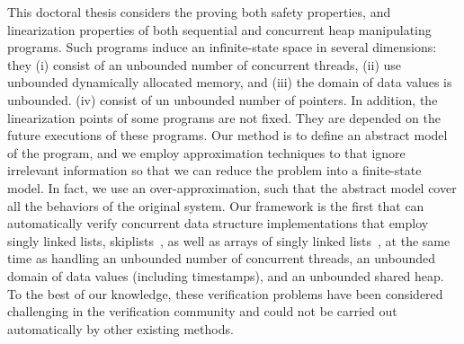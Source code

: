 
This doctoral thesis considers the proving both safety properties, and linearization properties of
both sequential and concurrent heap manipulating programs.
Such programs induce an infinite-state space in several dimensions:
they %
(i) consist of an unbounded number of concurrent threads, %
(ii) use unbounded dynamically allocated memory, and %
(iii) the domain of data values is unbounded. %
(iv) consist of un unbounded number of pointers. 
In addition, the linearization points of some programs are not fixed. They are depended on the future executions of these programs. 
Our method is to define an abstract model of the program, and we employ approximation techniques to that ignore irrelevant information so that we can reduce the problem into a finite-state model. In fact, we use an over-approximation, such that the abstract model cover all the behaviors of the original system.  Our framework is the first that
can automatically verify concurrent data structure implementations that employ
singly linked lists, skiplists~\cite{Fomitchev:2004,ArtOfMpP,Sundell:2005},
as well as arrays of singly linked lists~\cite{ts-stack},
at the same time as handling an unbounded
number of concurrent threads, an unbounded domain of data values
(including timestamps), and an unbounded shared heap. To the best of our knowledge, these verification problems have been
considered challenging in the verification community and
could not be carried out automatically by other existing methods.
